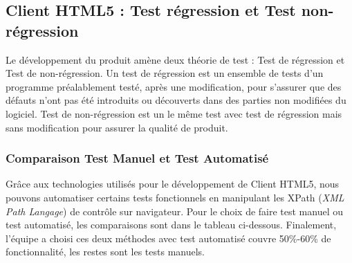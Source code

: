     
\subsection{Client HTML5 : Test régression et Test non-régression}
	Le développement du produit amène deux théorie de test : Test de régression et Test de non-régression. Un test de régression est un ensemble de tests d'un programme préalablement testé, après une modification, pour s'assurer que des défauts n'ont pas été introduits ou découverts dans des parties non modifiées du logiciel. Test de non-régression est un le même test avec test de régression mais sans modification pour assurer la qualité de produit.

    \subsubsection{Comparaison Test Manuel et Test Automatisé}
    Grâce aux technologies utilisés pour le développement de Client HTML5, nous pouvons automatiser certains tests fonctionnels en manipulant les XPath (\textit{XML Path Langage}) de contrôle sur navigateur. Pour le choix de faire test manuel ou test automatisé, les comparaisons sont dans le tableau ci-dessous. Finalement, l'équipe a choisi ces deux méthodes avec test automatisé couvre 50\%-60\% de fonctionnalité, les restes sont les tests manuels.

